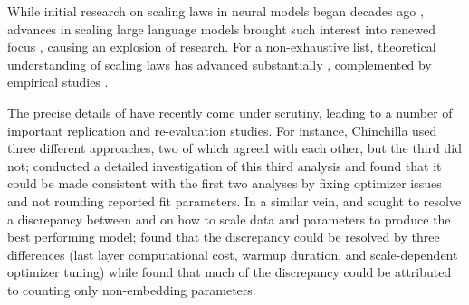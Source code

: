 While initial research on scaling laws in neural models began decades ago \citep{barkai1993scaling, mhaskar1996neural, pinkus1999approximation}, advances in scaling large language models brought such interest into renewed focus \citep{hestness2017deeplearningscalingpredictable, kaplan2020scaling, brown2020language}, causing an explosion of research.
For a non-exhaustive list, theoretical understanding of scaling laws has advanced substantially \citep{spigler2020asymptoticlearningcurves, bousquet2020theoryuniversallearning, hutter2021learningcurvetheory, sharma2022scaling, maloney2022solvable, roberts2022principles, bahri2024explaining, paquette2024fourplus3phases, atanasov2024scaling, bordelon2024dynamical, bordelon2024feature, lin2024scaling, brill2024neural}, complemented by empirical studies \citep{rosenfeld2020constructive, henighan2020scaling, gordon2021dataparamscalingnmt, tay2021scaleefficiently, ghorbani2021scaling, zhai2022scaling, alabdulmohsin2022revisitingscalinglaws, dehghani2023scaling, bachmann2023scalingmlpstaleinductive,everett2024scaling, qiu2025scalingcollapse}.

The precise details of \citet{hoffman2022chinchilla} have recently come under scrutiny, leading to a number of important replication and re-evaluation studies.
For instance, Chinchilla used three different approaches, two of which agreed with each other, but the third did not; \citet{besiroglu2024chinchillascalingreplicationattempt} conducted a detailed investigation of this third analysis and found that it could be made consistent with the first two analyses by fixing optimizer issues and not rounding reported fit parameters.
In a similar vein, \citet{porian2024resolvingdiscrepancies} and \citet{pearce2024reconciling} sought to resolve a discrepancy between \citet{hoffman2022chinchilla} and \citet{kaplan2020scaling} on how to scale data and parameters to produce the best performing model; \citet{porian2024resolvingdiscrepancies} found that the discrepancy could be resolved by three differences (last layer computational cost, warmup duration, and scale-dependent optimizer tuning) while \citet{pearce2024reconciling} found that much of the discrepancy could be attributed to \citet{kaplan2020scaling} counting only non-embedding parameters.

